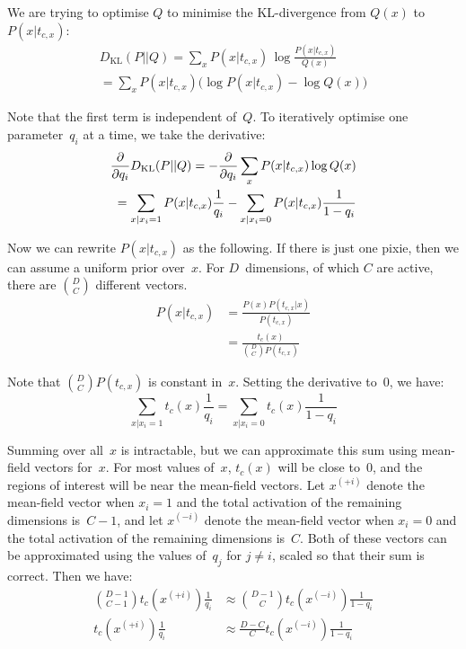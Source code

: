 \documentclass[11pt]{article}
\begin{document}
We are trying to optimise $Q$ to minimise the KL-divergence from $Q(x)$ to~$P(x|t_{c,x})$:
\begin{equation*}
\begin{split}
D_{\mathrm{KL}}(P||Q) = \sum_x P(x|t_{c,x}) \, \log\frac{P(x|t_{c,x})}{Q(x)} \\
= \sum_x P(x|t_{c,x}) \big( \log P(x|t_{c,x}) - \log Q(x) \big)
\end{split}
\end{equation*}

Note that the first term is independent of~$Q$.
To iteratively optimise one parameter~$q_i$ at a time,
we take the derivative:
\begin{equation*}
\begin{split}
\frac{\partial}{\partial q_i} D_{\mathrm{KL}}(P||Q) = -\frac{\partial}{\partial q_i} \sum_x P(x|t_{c,x}) \log Q(x) \\
= \sum_{x | x_i = 1} P(x|t_{c,x}) \frac{1}{q_i} - \sum_{x | x_i = 0} P(x|t_{c,x}) \frac{1}{1 - q_i}
\end{split}
\end{equation*}

Now we can rewrite $P(x|t_{c,x})$ as the following.
If there is just one pixie, then we can assume a uniform prior over~$x$.
For $D$~dimensions, of which $C$ are active, there are $D \choose C$ different vectors.
\begin{align*}
P(x|t_{c,x}) & = \frac{P(x)P(t_{c,x}|x)}{P(t_{c,x})} \\
& = \frac{t_c(x)}{{D \choose C}P(t_{c,x})}
\end{align*}

Note that ${D \choose C}P(t_{c,x})$ is constant in~$x$.
Setting the derivative to~$0$, we have:
\begin{equation*}
\sum_{x | x_i = 1} t_c(x) \frac{1}{q_i} = \sum_{x | x_i = 0} t_c(x) \frac{1}{1 - q_i}
\end{equation*}

Summing over all~$x$ is intractable,
but we can approximate this sum using mean-field vectors for~$x$.
For most values of~$x$, $t_c(x)$ will be close to~$0$,
and the regions of interest will be near the mean-field vectors.
Let $x^{(+i)}$ denote the mean-field vector
when $x_i=1$ and the total activation of the remaining dimensions is~$C-1$,
and let $x^{(-i)}$ denote the mean-field vector
when $x_i=0$ and the total activation of the remaining dimensions is~$C$.
Both of these vectors can be approximated using the values of~$q_j$ for $j \neq i$,
scaled so that their sum is correct.
Then we have:
\begin{align*}
{D\!-\!1 \choose C\!-\!1} t_c(x^{(+i)}) \frac{1}{q_i} & \approx {D\!-\!1 \choose C} t_c(x^{(-i)}) \frac{1}{1 - q_i} \\
t_c(x^{(+i)}) \frac{1}{q_i} & \approx \frac{D\!-\!C}{C} t_c(x^{(-i)}) \frac{1}{1 - q_i}
\end{align*}
\end{document}
